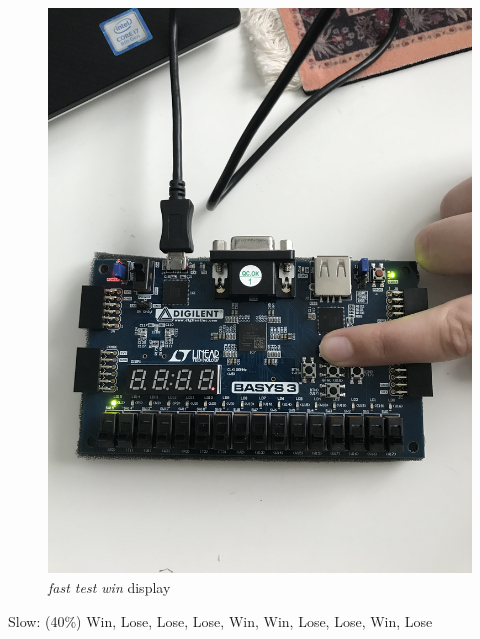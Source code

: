 \documentclass[11pt]{article}
\begin{document}
\begin{figure}[ht]\centering
	\includegraphics[angle = 270, width=1\textwidth]{fast2}
	\caption{\textit{fast test win} display}
	\label{fig:sim_with_table}
\end{figure}



Slow: (40\%)  Win, Lose, Lose, Lose, Win, Win, Lose, Lose, Win, Lose
\end{document}
